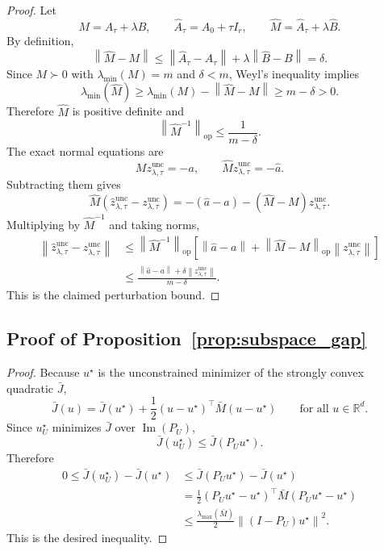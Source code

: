 \documentclass{article}
\newcommand{\RR}{\mathbb{R}}
\newcommand{\norm}[1]{\left\lVert #1 \right\rVert}
\newcommand{\paren}[1]{\left( #1 \right)}
\newcommand{\bracks}[1]{\left[ #1 \right]}
\begin{document}
\begin{proof}
Let
\[
M = A_\tau+\lambda B,
\qquad
\hat A_\tau = \hat A_0 + \tau I_r,
\qquad
\hat M = \hat A_\tau + \lambda \hat B.
\]
By definition,
\[
\norm{\hat M - M}
\le
\norm{\hat A_\tau-A_\tau}
+
\lambda \norm{\hat B-B}
=
\delta.
\]
Since \(M\succ 0\) with \(\lambda_{\min}(M)=m\) and \(\delta<m\), Weyl's inequality implies
\[
\lambda_{\min}(\hat M)
\ge
\lambda_{\min}(M) - \norm{\hat M-M}
\ge
m-\delta > 0.
\]
Therefore \(\hat M\) is positive definite and
\[
\norm{\hat M^{-1}}_{\mathrm{op}} \le \frac{1}{m-\delta}.
\]
The exact normal equations are
\[
Mz_{\lambda,\tau}^{\mathrm{unc}} = -a,
\qquad
\hat M \hat z_{\lambda,\tau}^{\mathrm{unc}} = -\hat a.
\]
Subtracting them gives
\[
\hat M\paren{\hat z_{\lambda,\tau}^{\mathrm{unc}} - z_{\lambda,\tau}^{\mathrm{unc}}}
=
-(\hat a-a) - (\hat M-M)z_{\lambda,\tau}^{\mathrm{unc}}.
\]
Multiplying by \(\hat M^{-1}\) and taking norms,
\begin{align*}
\norm{\hat z_{\lambda,\tau}^{\mathrm{unc}} - z_{\lambda,\tau}^{\mathrm{unc}}}
&\le
\norm{\hat M^{-1}}_{\mathrm{op}}
\bracks{
\norm{\hat a-a} + \norm{\hat M-M}_{\mathrm{op}}\norm{z_{\lambda,\tau}^{\mathrm{unc}}}
} \\
&\le
\frac{\norm{\hat a-a} + \delta \norm{z_{\lambda,\tau}^{\mathrm{unc}}}}{m-\delta}.
\end{align*}
This is the claimed perturbation bound.
\end{proof}

\subsection{Proof of Proposition~\ref{prop:subspace_gap}}

\begin{proof}
Because \(u^\star\) is the unconstrained minimizer of the strongly convex quadratic \(\bar J\),
\[
\bar J(u)=\bar J(u^\star) + \frac12 (u-u^\star)^\top \bar M (u-u^\star)
\qquad
\text{for all } u\in\RR^d.
\]
Since \(u_U^\star\) minimizes \(\bar J\) over \(\operatorname{Im}(P_U)\),
\[
\bar J(u_U^\star)\le \bar J(P_Uu^\star).
\]
Therefore
\begin{align*}
0
\le
\bar J(u_U^\star)-\bar J(u^\star)
&\le
\bar J(P_Uu^\star)-\bar J(u^\star) \\
&=
\frac12 (P_Uu^\star-u^\star)^\top \bar M (P_Uu^\star-u^\star) \\
&\le
\frac{\lambda_{\max}(\bar M)}{2}\norm{(I-P_U)u^\star}^2.
\end{align*}
This is the desired inequality.
\end{proof}
\end{document}

